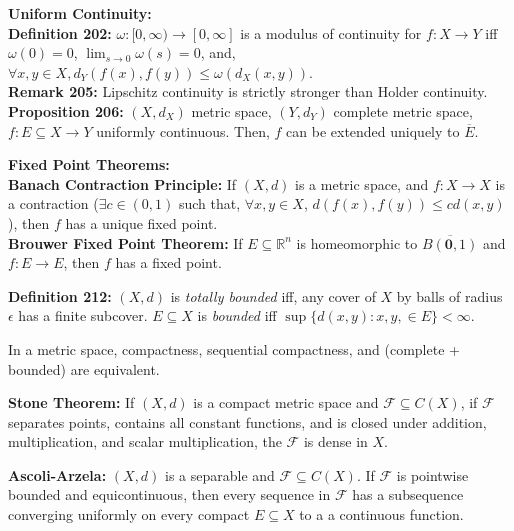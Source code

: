 \documentclass[11pt]{article}
\newcommand{\bzero}{\mathbf{0}}
\newcommand{\R}{\mathbb{R}} %
\begin{document}
{\bf Uniform Continuity:} \\
{\bf Definition 202:} $\omega : [0,\infty) \rightarrow [0,\infty]$ is a modulus
of continuity for $f : X \rightarrow Y$ iff $\omega(0) = 0$,
$\lim_{s \rightarrow 0} \omega(s) = 0$, and, $\forall x,y \in X,
d_Y(f(x),f(y)) \leq \omega(d_X(x,y))$. \\
{\bf Remark 205:} Lipschitz continuity is strictly stronger than H{o}lder
continuity. \\
{\bf Proposition 206:} $(X,d_X)$ metric space, $(Y,d_Y)$ complete metric space,
$f : E \subseteq X \rightarrow Y$ uniformly continuous. Then, $f$ can be
extended uniquely to $\overline{E}$.

{\bf Fixed Point Theorems:} \\
{\bf Banach Contraction Principle:} If $(X,d)$ is a metric space, and
$f : X \rightarrow X$ is a contraction ($\exists c \in (0,1)$ such that,
$\forall x,y \in X$, $d(f(x),f(y)) \leq cd(x,y)$), then $f$ has a unique fixed
point. \\
{\bf Brouwer Fixed Point Theorem:} If $E \subseteq \R^n$ is homeomorphic to
$\overline{B(\bzero,1)}$ and $f : E \rightarrow E$, then $f$ has a fixed
point.

{\bf Definition 212:} $(X,d)$ is \emph{totally bounded} iff, any cover of $X$ by
balls of radius $\epsilon$ has a finite subcover. $E \subseteq X$ is
\emph{bounded} iff $\sup \{d(x,y) : x,y, \in E\} < \infty$.

In a metric space, compactness, sequential compactness, and (complete +
bounded) are equivalent.

{\bf Stone Theorem:} If $(X,d)$ is a compact metric space and $\mathcal{F}
\subseteq C(X)$, if $\mathcal{F}$ separates points, contains all constant
functions, and is closed under addition, multiplication, and scalar
multiplication, the $\mathcal{F}$ is dense in $X$.

{\bf Ascoli-Arzela:} $(X,d)$ is a separable and $\mathcal{F} \subseteq
C(X)$. If $\mathcal{F}$ is pointwise bounded and equicontinuous, then every
sequence in $\mathcal{F}$ has a subsequence converging uniformly on every
compact $E \subseteq X$ to a a continuous function.
\end{document}
